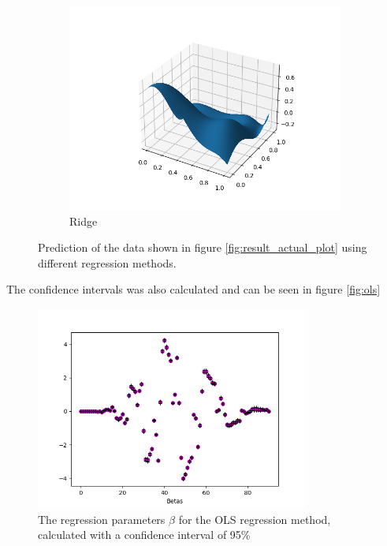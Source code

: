 \documentclass[../main.tex]{subfiles}
\begin{document}
\begin{figure}[htb!]
    \begin{subfigure}[b]{0.48\textwidth}
        \centering
        \includegraphics[trim=2.4cm 1cm 1.4cm 1cm, clip,width=1.1\textwidth]{../assets/ridge_franke_plot.png}
        \caption{Ridge}
    \end{subfigure}
    \caption{Prediction of the data shown in figure \ref{fig:result_actual_plot} using different regression methods.}
    \label{fig:result_reg_plots}
\end{figure}

The confidence intervals was also calculated and can be seen in figure \ref{fig:ols}

\begin{figure}[H]
 \centering
    \includegraphics[width=0.8\textwidth]{../assets/ols_franke_CI.png} 
    \caption{The regression parameters $\beta$ for the OLS regression method, calculated with a confidence interval of 95\%}
    \label{fig:OLS_CI_franke}
\end{figure}
\end{document}
